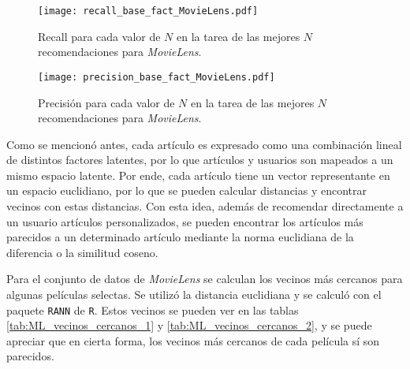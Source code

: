\begin{figure}[H]
	\centering
 	\texttt{[image: recall\_base\_fact\_MovieLens.pdf]}
 	\caption{Recall para cada valor de $N$ en la tarea de las mejores $N$ recomendaciones para \textit{MovieLens}.}
 	\label{fig:ML_recall_top_N}
\end{figure}

\begin{figure}[H]
	\centering
 	\texttt{[image: precision\_base\_fact\_MovieLens.pdf]}
 	\caption{Precisión para cada valor de $N$ en la tarea de las mejores $N$ recomendaciones para \textit{MovieLens}.}
 	\label{fig:ML_precision_top_N}
\end{figure}

Como se mencionó antes, cada artículo es expresado como una combinación lineal de distintos factores latentes, por lo que artículos y usuarios son mapeados a un mismo espacio latente. Por ende, cada artículo tiene un vector representante en un espacio euclidiano, por lo que se pueden calcular distancias y encontrar vecinos con estas distancias. Con esta idea, además de recomendar directamente a un usuario artículos personalizados, se pueden encontrar los artículos más parecidos a un determinado artículo mediante la norma euclidiana de la diferencia o la similitud coseno. 

Para el conjunto de datos de \textit{MovieLens} se calculan los vecinos más cercanos para algunas películas selectas. Se utilizó la distancia euclidiana y se calculó con el paquete \texttt{RANN} \cite{RANN_package} de \texttt{R}. Estos vecinos se pueden ver en las tablas \ref{tab:ML_vecinos_cercanos_1} y \ref{tab:ML_vecinos_cercanos_2}, y se puede apreciar que en cierta forma, los vecinos más cercanos de cada película sí son parecidos.

